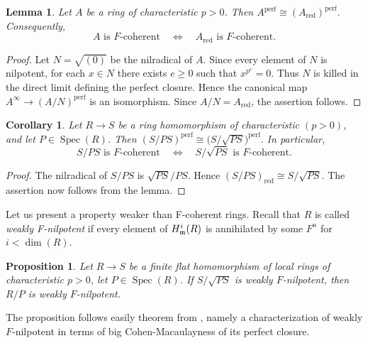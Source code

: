 \documentclass[10pt,a4paper]{amsart}
\newtheorem{lemma}[theorem]{Lemma}
\newtheorem{proposition}[theorem]{Proposition}
\newtheorem{corollary}[theorem]{Corollary}
\theoremstyle{definition}
\theoremstyle{remark}
\newcommand{\fm}{\frak{m}}
\begin{document}
\begin{lemma}
	Let \(A\) be a ring of characteristic \(p>0\). Then
	$A^{\mathrm{perf}} \cong (A_{\mathrm{red}})^{\mathrm{perf}}.
	$
	Consequently,
	\[
	A\text{ is $F$-coherent}
	\quad\Longleftrightarrow\quad
	A_{\mathrm{red}}\text{ is $F$-coherent}.
	\]
\end{lemma}

\begin{proof}
	Let \(N=\sqrt{(0)}\) be the nilradical of \(A\). Since every element of
	\(N\) is nilpotent, for each \(x\in N\) there exists \(e\geq 0\) such that
	\(x^{p^e}=0\). Thus \(N\) is killed in the direct limit defining the
	perfect closure. Hence the canonical map
	\(A^\infty\to (A/N)^{\mathrm{perf}}\)
	is an isomorphism. Since \(A/N=A_{\mathrm{red}}\), the assertion follows.
\end{proof}

\begin{corollary}
	Let \(R\to S\) be a ring homomorphism of characteristic $(p>0)$, and let
	\(P\in\operatorname{Spec}(R)\). Then
	$
	(S/PS)^{\mathrm{perf}}
	\cong
	\bigl(S/\sqrt{PS}\bigr)^{\mathrm{perf}}.
	$
	In particular,
	\[
	S/PS\text{ is $F$-coherent}
	\quad\Longleftrightarrow\quad
	S/\sqrt{PS}\text{ is $F$-coherent}.
	\]
\end{corollary}

\begin{proof}
	The nilradical of \(S/PS\) is
	$
	\sqrt{PS}/PS.
	$
	Hence
	$
	(S/PS)_{\mathrm{red}}
	\cong S/\sqrt{PS}.
	$
	The assertion now follows from the lemma.
\end{proof}



 
Let us present a property weaker than F-coherent rings. Recall  that $R$ is called \emph{weakly F-nilpotent}  if  every element of $H^i_\fm(R)$ is annihilated by some   $F^n$ for
$i < \dim(R)$. 
\begin{proposition}\label{212}
	Let \(R\to S\) be a finite  flat homomorphism of
	local rings of characteristic \(p>0\), let
	\(P\in\operatorname{Spec}(R)\).
 If \(S/\sqrt{PS}\) is weakly
	\(F\)-nilpotent, then \(R/P\) is weakly \(F\)-nilpotent.
\end{proposition}
The proposition  follows easily 
theorem from \cite[Proposition 12.22]{MP}, 
 namely a characterization of weakly \(F\)-nilpotent in terms of big Cohen-Macaulayness of its perfect closure. 
 
\end{document}
